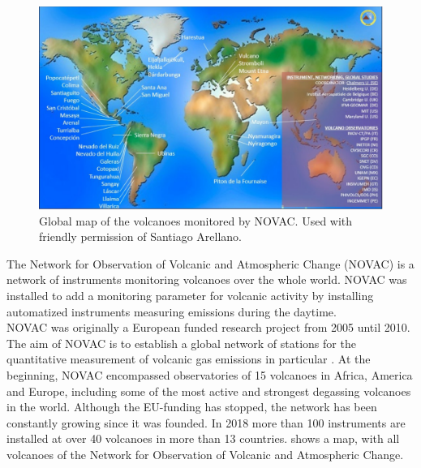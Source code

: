 
\begin{figure}[h]
	\centering
	\includegraphics[width=0.8\linewidth]{Bilder/NOVAC2015}
	\caption{Global map of the volcanoes monitored by NOVAC. Used with friendly permission of Santiago Arellano.}
	\label{fig:novac2015}
\end{figure}
The Network for Observation of Volcanic and Atmospheric Change (NOVAC) is a network of instruments monitoring volcanoes over the whole world. 
%
NOVAC was installed to add a monitoring parameter for volcanic activity by installing automatized instruments measuring  emissions during the daytime.\\
%
NOVAC was originally a European funded research project from 2005 until 2010. The aim of NOVAC is to establish a global network of stations for the quantitative measurement of volcanic gas emissions in particular . At the beginning, NOVAC encompassed observatories of 15 volcanoes in Africa, America and Europe, including some of the most active and strongest degassing volcanoes in the world. Although the EU-funding has stopped, the network has been constantly growing since it was founded. In 2018 more than 100 instruments are installed at over 40 volcanoes in more than 13 countries.
 shows a map, with all volcanoes of the Network for Observation of Volcanic and Atmospheric Change.\\

